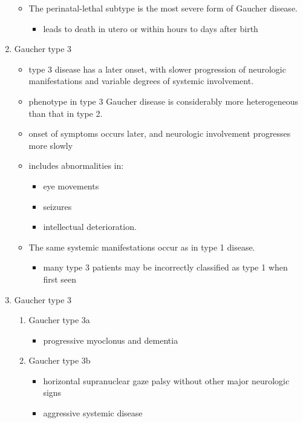 \documentclass{scrartcl}
\begin{document}
\begin{enumerate}
\begin{itemize}
\item The perinatal-lethal subtype is the most severe form of Gaucher
disease.

\begin{itemize}
\item leads to death in utero or within hours to days after
birth
\end{itemize}
\end{itemize}

\item Gaucher type 3
\label{sec:orgd6328ad}
\begin{itemize}
\item type 3 disease has a later onset, with slower progression of
neurologic manifestations and variable degrees of systemic
involvement.
\item phenotype in type 3 Gaucher disease is considerably more
heterogeneous than that in type 2.

\item onset of symptoms occurs later, and neurologic involvement
progresses more slowly

\item includes abnormalities in:
\begin{itemize}
\item eye movements
\item seizures
\item intellectual deterioration.
\end{itemize}

\item The same systemic manifestations occur as in type 1 disease.
\begin{itemize}
\item many type 3 patients may be incorrectly classified as type 1 when
first seen
\end{itemize}
\end{itemize}

\item Gaucher type 3
\label{sec:org9937953}
\begin{enumerate}
\item Gaucher type 3a
\label{sec:org5b68ccd}
\begin{itemize}
\item progressive myoclonus and dementia
\end{itemize}

\item Gaucher type 3b
\label{sec:org349044c}
\begin{itemize}
\item horizontal supranuclear gaze palsy without other major
neurologic signs
\item aggressive systemic disease
\end{itemize}


\end{enumerate}
\end{enumerate}
\end{document}
